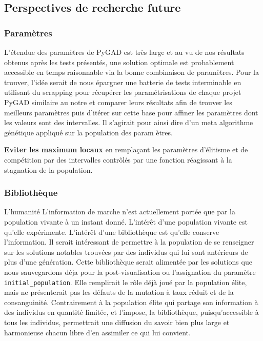 \documentclass[journal, a4paper]{IEEEtran}
\begin{document}
\subsection{Perspectives de recherche future}\label{subsec:perspectives-de-recherche-future}

\subsubsection{Paramètres}
	L'étendue des paramètres de PyGAD est très large et au vu de nos
	résultats obtenus après les tests présentés,
	une solution
	optimale est probablement accessible en temps raisonnable via
	la bonne combinaison de paramètres.
	Pour la trouver, l'idée serait de nous épargner une batterie de
	tests interminable en
	utilisant du scrapping pour récupérer les paramétrisations de chaque
	projet PyGAD similaire au notre et comparer leurs résultats afin de
	trouver
	les
	meilleurs paramètres puis d'itérer sur cette base pour affiner
	les paramètres dont les valeurs sont des intervalles. Il s'agirait
	pour ainsi dire d'un meta algorithme génétique appliqué sur
	la population des param
	ètres.

	\textbf{Eviter les maximum locaux} en remplaçant les paramètres
	d'élitisme et de compétition par des intervalles contrôlés par une
	fonction réagissant à la stagnation de la population.
\subsubsection{Bibliothèque}
	L'humanité
	L'information de marche n'est actuellement portée que par la
	population vivante à un instant donné. L'intérêt d'une population
	vivante est qu'elle expérimente. L'intérêt d'une bibliothèque
	est qu'elle conserve l'information.
	Il serait	intéressant de permettre à la population de se
	renseigner sur les solutions notables trouvées par des individus
	qui lui sont antérieurs de plus d'une génération.
	Cette bibliothèque serait alimentée par les solutions que nous
	sauvegardons
	déja pour la post-visualisation ou l'assignation du paramètre
	\texttt{initial\_population}.
	Elle remplirait le rôle déjà joué par la population élite, mais
	ne présenterait pas les défauts de la mutation à taux réduit et
	de la
	consanguinité.
	Contrairement à la population élite qui partage son information à
	des individus en quantité limitée, et l'impose, la bibliothèque,
	puisqu'accessible à tous les individus, permettrait une diffusion
	du savoir bien plus large et harmonieuse chacun libre d'en
	assimiler
	ce qui lui convient.
\end{document}
